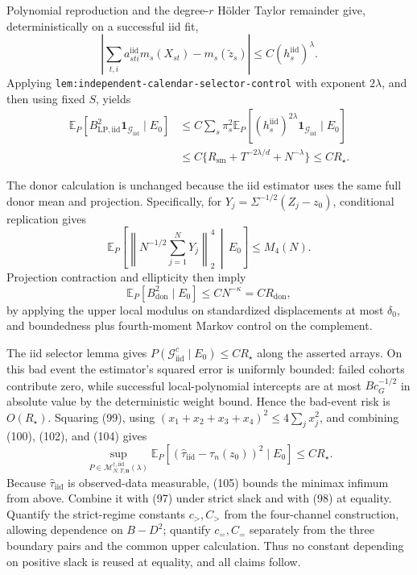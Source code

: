 Polynomial reproduction and the degree-\(r\) H\"older Taylor remainder give, deterministically on a successful iid fit,
\[
\left|\sum_{t,i}a_{sti}^{\mathrm{iid}}m_s(X_{st})
-m_s(\widetilde z_s)\right|
\leq C(h_s^{\mathrm{iid}})^\lambda.
\tag{101}
\]
Applying \texttt{lem:independent-calendar-selector-control} with exponent \(2\lambda\), and then using fixed \(S\), yields
\[
\begin{aligned}
\mathbb E_P[B_{\mathrm{LP,iid}}^2\mathbf1_{\mathcal G_{\mathrm{iid}}}\mid E_0]
&\leq C\sum_s\pi_s^2
\mathbb E_P[(h_s^{\mathrm{iid}})^{2\lambda}
\mathbf1_{\mathcal G_{\mathrm{iid}}}\mid E_0]\\
&\leq C\{R_{\mathrm{sm}}+T^{-2\lambda/d}+N^{-\lambda}\}
\leq CR_\star.
\end{aligned}
\tag{102}
\]

The donor calculation is unchanged because the iid estimator uses the same full donor mean and projection.  Specifically, for
\(Y_j=\Sigma^{-1/2}(Z_j-z_0)\), conditional replication gives
\[
\mathbb E_P\!\left[
\left\|N^{-1/2}\sum_{j=1}^{N}Y_j\right\|_2^4
\,\middle|\,E_0\right]
\leq M_4(N).
\tag{103}
\]
Projection contraction and ellipticity then imply
\[
\mathbb E_P[B_{\mathrm{don}}^2\mid E_0]
\leq CN^{-\kappa}=CR_{\mathrm{don}},
\tag{104}
\]
by applying the upper local modulus on standardized displacements at most \(\delta_0\), and boundedness plus fourth-moment Markov control on the complement.

The iid selector lemma gives
\(P(\mathcal G_{\mathrm{iid}}^c\mid E_0)\leq CR_\star\) along the asserted arrays.  On this bad event the estimator's squared error is uniformly bounded: failed cohorts contribute zero, while successful local-polynomial intercepts are at most \(Bc_G^{-1/2}\) in absolute value by the deterministic weight bound.  Hence the bad-event risk is \(O(R_\star)\).  Squaring (99), using
\((x_1+x_2+x_3+x_4)^2\leq4\sum_jx_j^2\), and combining (100), (102), and (104) gives
\[
\sup_{P\in\mathcal M_{N,T,\mathbf n}^{\dagger,\mathrm{iid}}(\lambda)}
\mathbb E_P[(\widehat\tau_{\mathrm{iid}}-\tau_n(z_0))^2\mid E_0]
\leq CR_\star.
\tag{105}
\]
Because \(\widehat\tau_{\mathrm{iid}}\) is observed-data measurable, (105) bounds the minimax infimum from above.  Combine it with (97) under strict slack and with (98) at equality.  Quantify the strict-regime constants \(c_{>},C_{>}\) from the four-channel construction, allowing dependence on \(B-D^2\); quantify \(c_{=},C_{=}\) separately from the three boundary pairs and the common upper calculation.  Thus no constant depending on positive slack is reused at equality, and all claims follow.

